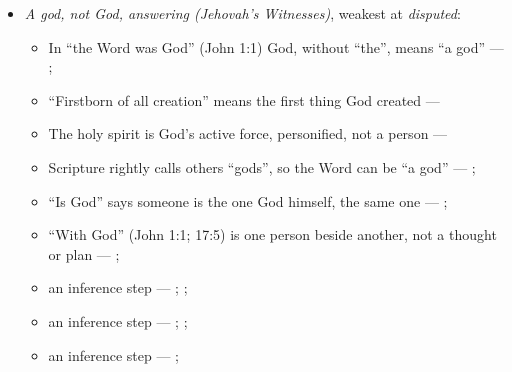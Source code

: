 \documentclass[11pt,paper=\testimonypaper,DIV=13,parskip=false]{scrartcl}
\begin{document}
\begin{itemize}
\item \emph{A god, not God, answering (Jehovah’s Witnesses)}, weakest at \emph{disputed}:
\begin{itemize}
\item In “the Word was God” (John 1:1) God, without “the”, means “a god” --- \cite[27]{watchtower-should-you-believe-trinity-1989}; \cite{new-world-translation-2013}
\item “Firstborn of all creation” means the first thing God created --- \cite[14]{watchtower-should-you-believe-trinity-1989}
\item The holy spirit is God’s active force, personified, not a person --- \cite[20--23]{watchtower-should-you-believe-trinity-1989}
\item Scripture rightly calls others “gods”, so the Word can be “a god” --- \cite[28]{watchtower-should-you-believe-trinity-1989}; \cite[31]{watchtower-questions-from-readers-1986}
\item “Is God” says someone is the one God himself, the same one --- \cite[ch. 8, Are Jesus and the Father One in Purpose Only?]{bernard-oneness-of-god-1983}; \cite[27]{watchtower-should-you-believe-trinity-1989}
\item “With God” (John 1:1; 17:5) is one person beside another, not a thought or plan --- \cite[3, The Triune God]{kibbey-living-systematic-theology-2026}; \cite[27]{watchtower-should-you-believe-trinity-1989}
\item an inference step --- \cite[28]{watchtower-should-you-believe-trinity-1989}; \cite[31]{watchtower-questions-from-readers-1986}; \cite[Origen, Against Celsus V.39]{roberts-ante-nicene-fathers-4-1885}
\item an inference step --- \cite[ch. 8, Are Jesus and the Father One in Purpose Only?]{bernard-oneness-of-god-1983}; \cite[27]{watchtower-should-you-believe-trinity-1989}; \cite[I, q. 28, a. 3]{aquinas-summa-1920}
\item an inference step --- \cite[23]{watchtower-should-you-believe-trinity-1989}; \cite[122--123]{roberts-christendom-astray}
\end{itemize}
\end{itemize}
\end{document}
